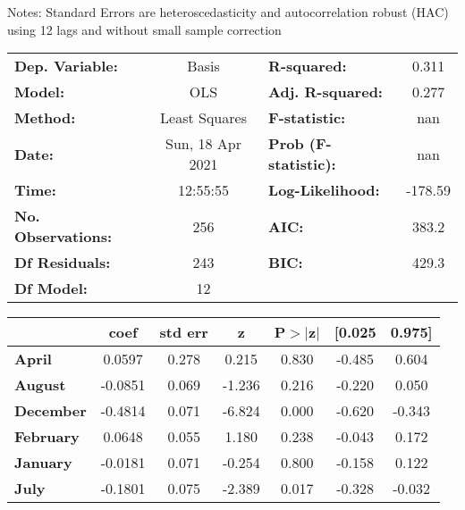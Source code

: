 Notes: \newline
 [1] Standard Errors are heteroscedasticity and autocorrelation robust (HAC) using 12 lags and without small sample correction
\begin{center}
\begin{tabular}{lclc}
\toprule
\textbf{Dep. Variable:}    &      Basis       & \textbf{  R-squared:         } &     0.311   \\
\textbf{Model:}            &       OLS        & \textbf{  Adj. R-squared:    } &     0.277   \\
\textbf{Method:}           &  Least Squares   & \textbf{  F-statistic:       } &       nan   \\
\textbf{Date:}             & Sun, 18 Apr 2021 & \textbf{  Prob (F-statistic):} &      nan    \\
\textbf{Time:}             &     12:55:55     & \textbf{  Log-Likelihood:    } &   -178.59   \\
\textbf{No. Observations:} &         256      & \textbf{  AIC:               } &     383.2   \\
\textbf{Df Residuals:}     &         243      & \textbf{  BIC:               } &     429.3   \\
\textbf{Df Model:}         &          12      & \textbf{                     } &             \\
\bottomrule
\end{tabular}
\begin{tabular}{lcccccc}
                   & \textbf{coef} & \textbf{std err} & \textbf{z} & \textbf{P$> |$z$|$} & \textbf{[0.025} & \textbf{0.975]}  \\
\midrule
\textbf{April}     &       0.0597  &        0.278     &     0.215  &         0.830        &       -0.485    &        0.604     \\
\textbf{August}    &      -0.0851  &        0.069     &    -1.236  &         0.216        &       -0.220    &        0.050     \\
\textbf{December}  &      -0.4814  &        0.071     &    -6.824  &         0.000        &       -0.620    &       -0.343     \\
\textbf{February}  &       0.0648  &        0.055     &     1.180  &         0.238        &       -0.043    &        0.172     \\
\textbf{January}   &      -0.0181  &        0.071     &    -0.254  &         0.800        &       -0.158    &        0.122     \\
\textbf{July}      &      -0.1801  &        0.075     &    -2.389  &         0.017        &       -0.328    &       -0.032     \\

\end{tabular}
\end{center}
